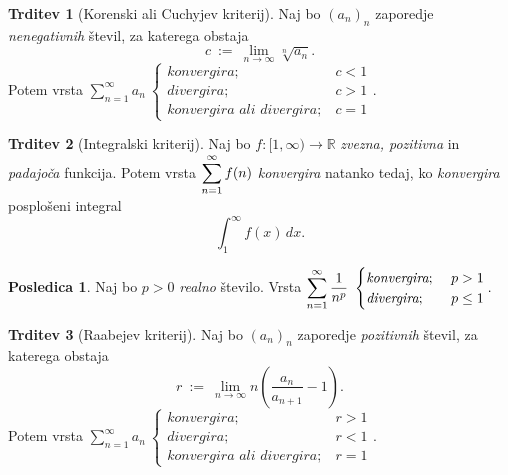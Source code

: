 \documentclass[11pt]{article}
\newcommand{\R}{\mathbb{R}}
\theoremstyle{definition}
\theoremstyle{definition}
\newtheorem{trditev}{Trditev}[section]
\theoremstyle{definition}
\theoremstyle{theorem}
\newtheorem*{posledica}{Posledica}
\begin{document}
\begin{trditev}[Korenski ali Cuchyjev kriterij]

Naj bo $(a_n)_n$ zaporedje \textit{nenegativnih} števil, za katerega obstaja
$$c ~:=~ \lim_{n \rightarrow \infty} \sqrt[n]{a_n}.$$
Potem vrsta $\sum_{n=1}^\infty a_n ~ \begin{cases}
\textit{konvergira}; ~&c<1\\
\textit{divergira}; ~&c>1 \\
\textit{konvergira ali divergira}; ~&c=1
\end{cases}.$ 

\end{trditev}
\vspace{0.5cm}

\begin{trditev}[Integralski kriterij]

Naj bo $f: [1, \infty) \rightarrow \R$ \textit{zvezna, pozitivna} in \textit{padajoča} funkcija. Potem vrsta $\mathlarger{\sum_{n=1}^\infty f(n)}$ \textit{konvergira} natanko tedaj, ko \textit{konvergira} posplošeni integral
$$\int_1^\infty f(x)\,dx.$$

\end{trditev}
\vspace{0.5cm}

\begin{posledica}

Naj bo $p>0$ \textit{realno} število. Vrsta $\mathlarger{\sum_{n=1}^\infty \frac{1}{n^p}} ~ \begin{cases}
\textit{konvergira}; ~&p>1 \\
\textit{divergira}; ~&p \leq 1
\end{cases}.$

\end{posledica}
\vspace{0.5cm}

\begin{trditev}[Raabejev kriterij]

Naj bo $(a_n)_n$ zaporedje \textit{pozitivnih} števil, za katerega obstaja
$$r ~:=~ \lim_{n \rightarrow \infty} n \left( \frac{a_n}{a_{n+1}} - 1 \right).$$
Potem vrsta $\sum_{n=1}^\infty a_n ~ \begin{cases}
\textit{konvergira}; ~&r>1 \\
\textit{divergira}; ~&r<1 \\
\textit{konvergira ali divergira}; ~&r=1
\end{cases}.$

\end{trditev}
\vspace{0.5cm}
\end{document}
